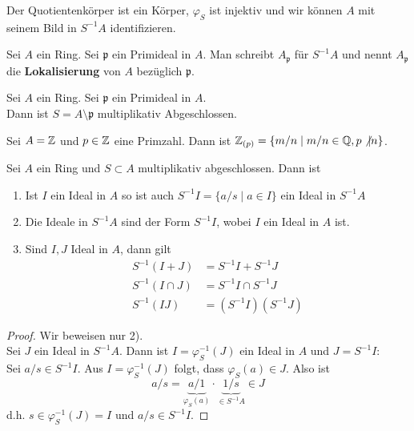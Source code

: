 	\begin{lem}
		Der Quotientenkörper ist ein Körper, $\varphi_S$ ist injektiv und wir können $A$ mit seinem Bild in $S^{-1}A$ identifizieren.
	\end{lem}

	\begin{definition}
		Sei $A$ ein Ring. Sei $\mathfrak p$ ein Primideal in $A$. Man schreibt $A_{\mathfrak p}$ für $S^{-1}A$ und nennt $A_{\mathfrak p}$ die \textbf{Lokalisierung} von $A$ bezüglich $\mathfrak p$.
	\end{definition}

	\begin{lem}
		Sei $A$ ein Ring. Sei $\mathfrak p$ ein Primideal in $A$.\\
		Dann ist $S=A\setminus \mathfrak p$ multiplikativ Abgeschlossen.
	\end{lem}

	\begin{lem}
		Sei $A=\mathbb{Z}$ und $p\in\mathbb{Z}$ eine Primzahl. Dann ist $\mathbb{Z}_{(p)}=\{m/n\mid m/n\in\mathbb{Q},p\not|n\}$.
	\end{lem}

	\begin{satz}
		Sei $A$ ein Ring und $S\subset A$ multiplikativ abgeschlossen. Dann ist
		\begin{enumerate}
			\item Ist $I$ ein Ideal in $A$ so ist auch $S^{-1}I=\{a/s\mid a\in I\}$ ein Ideal in $S^{-1}A$\\
			\item Die Ideale in $S^{-1}A$ sind der Form $S^{-1}I$, wobei $I$ ein Ideal in $A$ ist.
			\item Sind $I,J$ Ideal in $A$, dann gilt
			\begin{align*}
				S^{-1}(I+J)&=S^{-1}I+S^{-1}J\\
				S^{-1}(I\cap J)&=S^{-1}I\cap S^{-1}J\\
				S^{-1}(IJ)&=(S^{-1}I)(S^{-1}J)
			\end{align*}
		\end{enumerate}
	\end{satz}
	\begin{proof}
		Wir beweisen nur 2).\\
		Sei $J$ ein Ideal in $S^{-1}A$. Dann ist $I=\varphi_S^{-1}(J)$ ein Ideal in $A$ und $J=S^{-1}I$:\\
		Sei $a/s\in S^{-1}I$. Aus $I=\varphi^{-1}_S(J)$ folgt, dass $\varphi_S(a)\in J$. Also ist
		\[a/s=\underbrace{a/1}_{\varphi_S(a)}\cdot\underbrace{1/s}_{\in S^{-1}A}\in J\]
		d.h. $s\in\varphi^{-1}_S(J)=I$ und $a/s\in S^{-1}I$.
	\end{proof}

